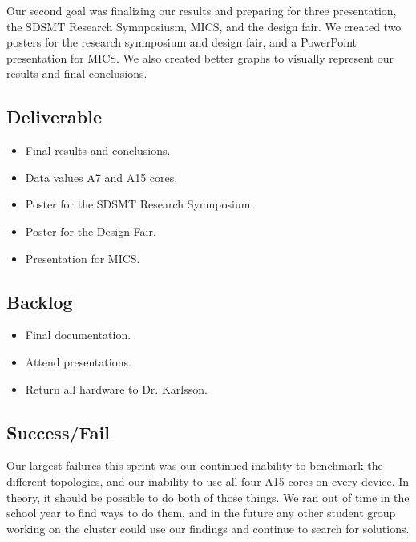 Our second goal was finalizing our results and preparing for three presentation, the SDSMT Research Symnposiusm, MICS, and the design fair. We created two posters for the research symnposium and design fair, and a PowerPoint presentation for MICS. We also created better graphs to visually represent our results and final conclusions. \\

\subsection{Deliverable}

\begin{itemize}
\item Final results and conclusions.
\item Data values A7 and A15 cores.
\item Poster for the SDSMT Research Symnposium.
\item Poster for the Design Fair.
\item Presentation for MICS.
\end{itemize}

\subsection{Backlog}

\begin{itemize}
\item Final documentation.
\item Attend presentations.
\item Return all hardware to Dr. Karlsson.
\end{itemize}

\subsection{Success/Fail}

Our largest failures this sprint was our continued inability to benchmark the different topologies, and our inability to use all four A15 cores on every device. In theory, it should be possible to do both of those things. We ran out of time in the school year to find ways to do them, and in the future any other student group working on the cluster could use our findings and continue to search for solutions.
